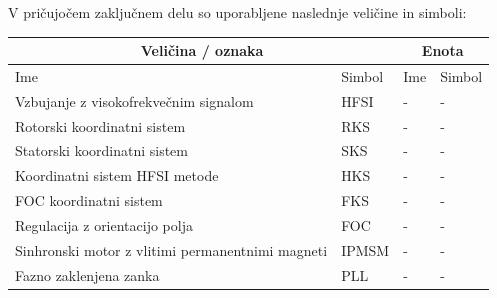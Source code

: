 \documentclass[a4paper,twoside,openright,12pt,slovene]{book}
\begin{document}

\tableofcontents

\seznamslik

\seznamsimbolov
V pričujočem zaključnem delu so uporabljene naslednje veličine in simboli:

\begin{center}
    \begin{tabular}{*{4}{l}} \hline
        \multicolumn{2}{c}{\bf{Veličina / oznaka}}           & \multicolumn{2}{c}{\bf{Enota}} \\ \hline
        Ime                                                        & Simbol                                 & Ime                  & Simbol                 \\ \hline
        Vzbujanje z visokofrekvečnim signalom                      & HFSI                                   & -                    & -                      \\
        Rotorski koordinatni sistem                                & RKS                                    & -                    & -                      \\
        Statorski koordinatni sistem                               & SKS                                    & -                    & -                      \\
        Koordinatni sistem HFSI metode                             & HKS                                    & -                    & -                      \\
        FOC koordinatni sistem                                     & FKS                                    & -                    & -                      \\
        Regulacija z orientacijo polja                             & FOC                                    & -                    & -                      \\
        Sinhronski motor z vlitimi permanentnimi magneti           & IPMSM                                  & -                    & -                      \\
        Fazno zaklenjena zanka                                     & PLL                                    & -                    & -                      \\

\end{tabular}
\end{center}
\end{document}
